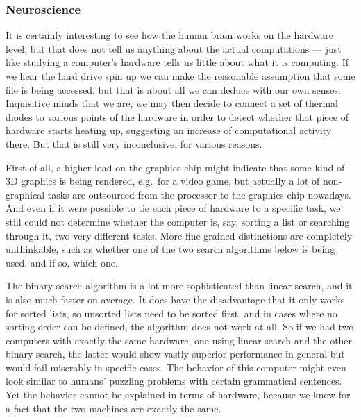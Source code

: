 \subsubsection{Neuroscience}

It is certainly interesting to see how the human brain works on the hardware level, but that does not tell us anything about the actual computations --- just like studying a computer's hardware tells us little about what it is computing.
If we hear the hard drive spin up we can make the reasonable assumption that some file is being accessed, but that is about all we can deduce with our own senses.
Inquisitive minds that we are, we may then decide to connect a set of thermal diodes to various points of the hardware in order to detect whether that piece of hardware starts heating up, suggesting an increase of computational activity there.
But that is still very inconclusive, for various reasons.

First of all, a higher load on the graphics chip might indicate that some kind of 3D graphics is being rendered, e.g.\ for a video game, but actually a lot of non-graphical tasks are outsourced from the processor to the graphics chip nowadays.
And even if it were possible to tie each piece of hardware to a specific task,
we still could not determine whether the computer is, say, sorting a list or searching through it, two very different tasks.
More fine-grained distinctions are completely unthinkable, such as whether one of the two search algorithms below is being used, and if so, which one.
%
\begin{center}
\end{center}
\begin{center}
\end{center}
%
The binary search algorithm is a lot more sophisticated than linear search, and it is also much faster on average.
It does have the disadvantage that it only works for sorted lists, so unsorted lists need to be sorted first, and in cases where no sorting order can be defined, the algorithm does not work at all.
So if we had two computers with exactly the same hardware, one using linear search and the other binary search, the latter would show vastly superior performance in general but would fail miserably in specific cases.
The behavior of this computer might even look similar to humans' puzzling problems with certain grammatical sentences.
Yet the behavior cannot be explained in terms of hardware, because we know for a fact that the two machines are exactly the same.

